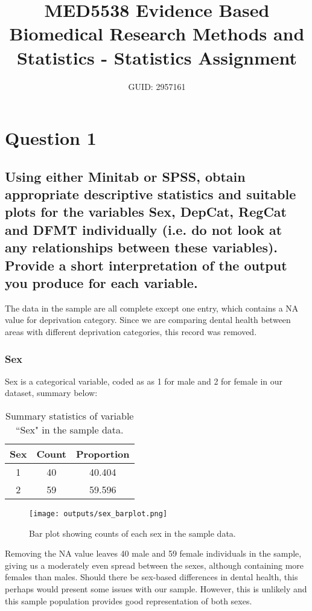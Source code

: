 \documentclass[11pt]{article}
\title{MED5538 Evidence Based Biomedical Research Methods and Statistics - Statistics Assignment}
\author{GUID: 2957161}
\begin{document}
\maketitle

\section{Question 1}
\subsection{Using either Minitab or SPSS, obtain appropriate descriptive statistics and suitable plots for the variables Sex, DepCat, RegCat and DFMT individually (i.e. do not look at any relationships between these variables). Provide a short interpretation of the output you produce for each variable.}

The data in the sample are all complete except one entry, which contains a NA value for deprivation category. Since we are comparing dental health between areas with different deprivation categories, this record was removed.

\subsubsection*{Sex}

Sex is a categorical variable, coded as as 1 for male and 2 for female in our dataset, summary below:

\begin{table}[h]
\centering
\begin{tabular}{|c|c|c|}
\hline
Sex & Count & Proportion \\
\hline
1 & 40 & 40.404 \\
2 & 59 &  59.596 \\
\hline
\end{tabular}
\caption{Summary statistics of variable ``Sex" in the sample data.}
\label{tab:sex-data}
\end{table}
\begin{figure}
  \centering
  \texttt{[image: outputs/sex\_barplot.png]}
  \caption{Bar plot showing counts of each sex in the sample data.}
  \label{fig:sex-barplot}
\end{figure}
\FloatBarrier  %


Removing the NA value leaves 40 male and 59 female individuals in the sample, giving us a moderately even spread between the sexes, although containing more females than males. Should there be sex-based differences in dental health, this perhaps would present some issues with our sample. However, this is unlikely and this sample population provides good representation of both sexes.
\end{document}
